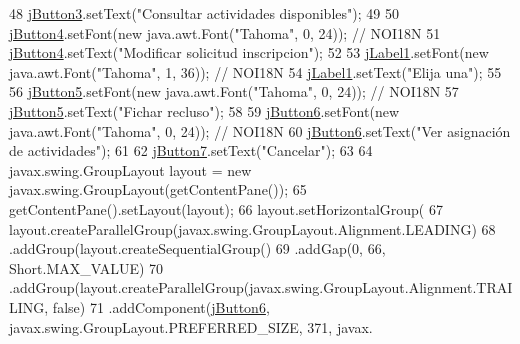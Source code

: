 \begin{DoxyCode}
48         \mbox{\hyperlink{classinterfacessoguar_1_1presoscu07_ab74517a901b30e28dab9f184845d8e00}{jButton3}}.setText(\textcolor{stringliteral}{"Consultar actividades disponibles"});
49 
50         \mbox{\hyperlink{classinterfacessoguar_1_1presoscu07_a59d84610b52e55806c464f05ac4d1f9a}{jButton4}}.setFont(\textcolor{keyword}{new} java.awt.Font(\textcolor{stringliteral}{"Tahoma"}, 0, 24)); \textcolor{comment}{// NOI18N}
51         \mbox{\hyperlink{classinterfacessoguar_1_1presoscu07_a59d84610b52e55806c464f05ac4d1f9a}{jButton4}}.setText(\textcolor{stringliteral}{"Modificar solicitud inscripcion"});
52 
53         \mbox{\hyperlink{classinterfacessoguar_1_1presoscu07_a085ba36143328d4629072e229e1b5acb}{jLabel1}}.setFont(\textcolor{keyword}{new} java.awt.Font(\textcolor{stringliteral}{"Tahoma"}, 1, 36)); \textcolor{comment}{// NOI18N}
54         \mbox{\hyperlink{classinterfacessoguar_1_1presoscu07_a085ba36143328d4629072e229e1b5acb}{jLabel1}}.setText(\textcolor{stringliteral}{"Elija una"});
55 
56         \mbox{\hyperlink{classinterfacessoguar_1_1presoscu07_a235597181f1514e6ad0aa24146a9ea4a}{jButton5}}.setFont(\textcolor{keyword}{new} java.awt.Font(\textcolor{stringliteral}{"Tahoma"}, 0, 24)); \textcolor{comment}{// NOI18N}
57         \mbox{\hyperlink{classinterfacessoguar_1_1presoscu07_a235597181f1514e6ad0aa24146a9ea4a}{jButton5}}.setText(\textcolor{stringliteral}{"Fichar recluso"});
58 
59         \mbox{\hyperlink{classinterfacessoguar_1_1presoscu07_a43f487b75785b57a2b918d23dfc94611}{jButton6}}.setFont(\textcolor{keyword}{new} java.awt.Font(\textcolor{stringliteral}{"Tahoma"}, 0, 24)); \textcolor{comment}{// NOI18N}
60         \mbox{\hyperlink{classinterfacessoguar_1_1presoscu07_a43f487b75785b57a2b918d23dfc94611}{jButton6}}.setText(\textcolor{stringliteral}{"Ver asignación de actividades"});
61 
62         \mbox{\hyperlink{classinterfacessoguar_1_1presoscu07_a3f67db575069b29512c7ce7b0f2e8062}{jButton7}}.setText(\textcolor{stringliteral}{"Cancelar"});
63 
64         javax.swing.GroupLayout layout = \textcolor{keyword}{new} javax.swing.GroupLayout(getContentPane());
65         getContentPane().setLayout(layout);
66         layout.setHorizontalGroup(
67             layout.createParallelGroup(javax.swing.GroupLayout.Alignment.LEADING)
68             .addGroup(layout.createSequentialGroup()
69                 .addGap(0, 66, Short.MAX\_VALUE)
70                 .addGroup(layout.createParallelGroup(javax.swing.GroupLayout.Alignment.TRAILING, \textcolor{keyword}{false})
71                     .addComponent(\mbox{\hyperlink{classinterfacessoguar_1_1presoscu07_a43f487b75785b57a2b918d23dfc94611}{jButton6}}, javax.swing.GroupLayout.PREFERRED\_SIZE, 371, javax.

\end{DoxyCode}
